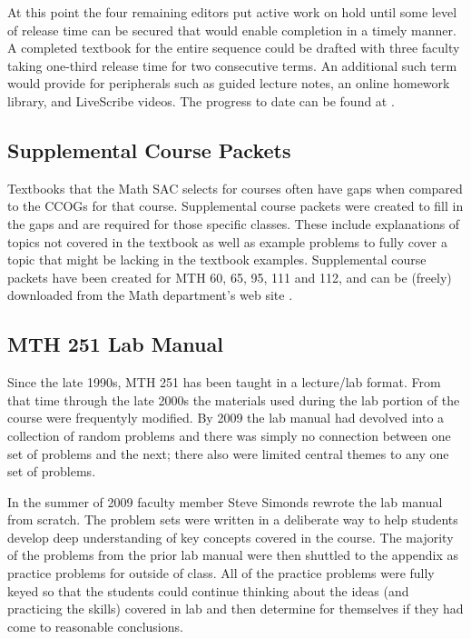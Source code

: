 At this point the four remaining editors put active work on hold until some level of
release time can be secured that would enable completion in a timely manner.  A
completed textbook for the entire sequence could be drafted with three faculty
taking one-third release time for two consecutive terms.  An additional such
term would provide for peripherals such as guided lecture notes, an online
homework library, and LiveScribe videos. The progress to date can be found at
\cite{mth111project}.
 
\subsection{Supplemental Course Packets}
Textbooks that the Math SAC selects for courses often have gaps when
compared to the CCOGs for that course.  Supplemental course packets were created
to fill in the gaps and are required for those specific classes.  These include
explanations of topics not covered in the textbook as well as example
problems to fully cover a topic that might be lacking in the textbook examples.
Supplemental course packets have been created for MTH 60, 65, 95, 111 and 112,
and can be (freely) downloaded from the Math department's web site
\cite{pccmathdept}.
 
\subsection{MTH 251 Lab Manual}
Since the late 1990s, MTH 251 has been taught in a lecture/lab format.  From
that time through the late 2000s the materials used during the lab portion of
the course were frequentyly modified.  By 2009 the lab manual had
devolved into a collection of random problems and there was simply no connection 
between one set of problems and the next; there also were limited central themes to any one set of problems.

In the summer of 2009 faculty member Steve Simonds rewrote the lab manual from
scratch.  The problem sets were written in a deliberate way to help students
develop deep understanding of key concepts covered in the course.  The majority
of the problems from the prior lab manual were then shuttled to the appendix as
practice problems for outside of class.  All of the practice problems were fully
keyed so that the students could continue thinking about the ideas (and
practicing the skills) covered in lab and then determine for themselves if they
had come to reasonable conclusions.

